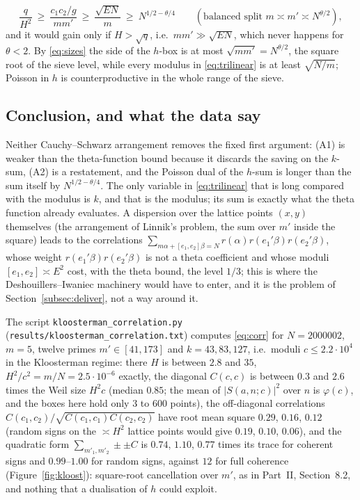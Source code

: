 \documentclass[11pt]{amsart}
\theoremstyle{remark}
\begin{document}
\[
\frac q{H^2}\ \ge\ \frac{c_1c_2/g}{mm'}\ \ge\ \frac{\sqrt{EN}}{m}\ \ge\ N^{1/2-\theta/4}\qquad(\text{balanced split }m\asymp m'\asymp N^{\theta/2}),
\]
and it would gain only if $H>\sqrt q$, i.e.\ $mm'\gg\sqrt{EN}$, which never happens for $\theta<2$. By \eqref{eq:sizes} the side of the $h$-box is at most $\sqrt{mm'}=N^{\theta/2}$, the square root of the sieve level, while every modulus in \eqref{eq:trilinear} is at least $\sqrt{N/m}$; Poisson in $h$ is counterproductive in the whole range of the sieve.

\subsection{Conclusion, and what the data say}
Neither Cauchy--Schwarz arrangement removes the fixed first argument: (A1) is weaker than the theta-function bound because it discards the saving on the $k$-sum, (A2) is a restatement, and the Poisson dual of the $h$-sum is longer than the sum itself by $N^{1/2-\theta/4}$. The only variable in \eqref{eq:trilinear} that is long compared with the modulus is $k$, and that is the modulus; its sum is exactly what the theta function already evaluates. A dispersion over the lattice points $(x,y)$ themselves (the arrangement of Linnik's problem, the sum over $m'$ inside the square) leads to the correlations $\sum_{m\alpha+[e_1,e_2]\beta=N}r(\alpha)r(e_1'\beta)r(e_2'\beta)$, whose weight $r(e_1'\beta)r(e_2'\beta)$ is not a theta coefficient and whose moduli $[e_1,e_2]\asymp E^2$ cost, with the theta bound, the level $1/3$; this is where the Deshouillers--Iwaniec machinery would have to enter, and it is the problem of Section~\ref{subsec:deliver}, not a way around it.

The script \texttt{kloosterman\_correlation.py} (\texttt{results/kloosterman\_correlation.txt}) computes \eqref{eq:corr} for $N=2000002$, $m=5$, twelve primes $m'\in[41,173]$ and $k=43,83,127$, i.e.\ moduli $c\le2.2\cdot10^4$ in the Kloosterman regime: there $H$ is between $2.8$ and $35$, $H^2/c^2=m/N=2.5\cdot10^{-6}$ exactly, the diagonal $C(c,c)$ is between $0.3$ and $2.6$ times the Weil size $H^2c$ (median $0.85$; the mean of $|S(a,n;c)|^2$ over $n$ is $\varphi(c)$, and the boxes here hold only $3$ to $600$ points), the off-diagonal correlations $C(c_1,c_2)/\sqrt{C(c_1,c_1)C(c_2,c_2)}$ have root mean square $0.29$, $0.16$, $0.12$ (random signs on the $\asymp H^2$ lattice points would give $0.19$, $0.10$, $0.06$), and the quadratic form $\sum_{m'_1,m'_2}\pm\pm C$ is $0.74$, $1.10$, $0.77$ times its trace for coherent signs and $0.99$--$1.00$ for random signs, against $12$ for full coherence (Figure~\ref{fig:kloost}): square-root cancellation over $m'$, as in Part~II, Section~8.2, and nothing that a dualisation of $h$ could exploit.
\end{document}
